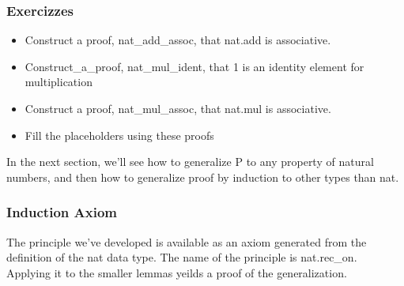 \documentclass[letterpaper,10pt,english]{sphinxmanual}
\begin{document}
\begin{sphinxVerbatim}[commandchars=\\\{\}]
   \PYG{o}{[}\PYG{o}{]}
   \PYG{o}{[}\PYG{o}{]}
\end{sphinxVerbatim}


\subsubsection{Exercizzes}
\label{\detokenize{A_03_Recursive_Types:exercizzes}}\begin{itemize}
\item {} 
\sphinxAtStartPar
Construct a proof, nat\_add\_assoc, that nat.add is associative.

\item {} 
\sphinxAtStartPar
Construct\_a\_proof, nat\_mul\_ident, that 1 is an identity element for multiplication

\item {} 
\sphinxAtStartPar
Construct a proof, nat\_mul\_assoc, that nat.mul is associative.

\item {} 
\sphinxAtStartPar
Fill the  placeholders using these proofs

\end{itemize}

\sphinxAtStartPar
In the next section, we’ll see how to generalize P
to any property of natural numbers, and then how to
generalize proof by induction to other types than
nat.


\subsubsection{Induction Axiom}
\label{\detokenize{A_03_Recursive_Types:induction-axiom}}
\sphinxAtStartPar
The principle we’ve developed is available as an axiom
generated from the definition of the nat data type. The
name of the principle is nat.rec\_on. Applying it to the
smaller lemmas yeilds a proof of the generalization.

\begin{sphinxVerbatim}[commandchars=\\\{\}]
 
\end{sphinxVerbatim}
\end{document}
